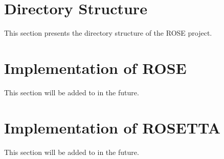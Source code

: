 \section{Directory Structure}
This section presents the directory structure of the ROSE project.



\begin{comment}
\begin{latexonly}
\begin{figure}[tb]
\texttt{[image: roseDirectoryMap]}
\caption{Directory structure of ROSE project.}
\end{figure}
\end{latexonly}

\begin{htmlonly}
\begin{figure}[tb]

\texttt{[image: roseDirectoryMap]}
\caption{Directory structure of ROSE project.}
\label{designAndImplementation:directoryStructure}
\end{figure}
\end{htmlonly}

   This figure is formed from a Perl script ({\tt ROSE/scripts/lsvis}) which generates
the graph when the documentation is built.

\end{comment}

\section{Implementation of ROSE}
     This section will be added to in the future.
     
\section{Implementation of ROSETTA}
     This section will be added to in the future.

